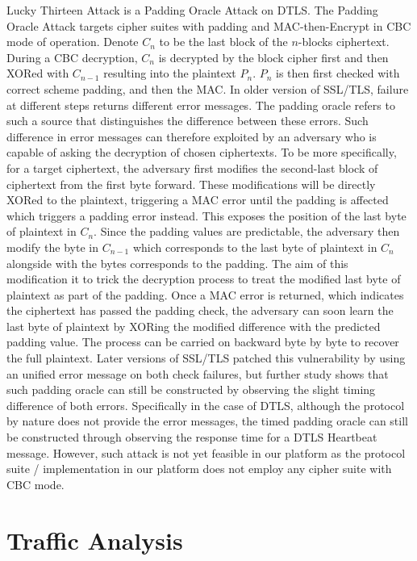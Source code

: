 Lucky Thirteen Attack\cite{Lucky13} is a Padding Oracle Attack\cite{PaddingOracle} on DTLS. The Padding Oracle Attack targets cipher suites with padding and MAC-then-Encrypt in CBC mode of operation. Denote $C_n$ to be the last block of the $n$-blocks ciphertext. During a CBC decryption, $C_n$ is decrypted by the block cipher first and then XORed with $C_{n-1}$ resulting into the plaintext $P_n$. $P_n$ is then first checked with correct scheme padding, and then the MAC. In older version of SSL/TLS, failure at different steps returns different error messages. The padding oracle refers to such a source that distinguishes the difference between these errors. Such difference in error messages can therefore exploited by an adversary who is capable of asking the decryption of chosen ciphertexts. To be more specifically, for a target ciphertext, the adversary first modifies the second-last block of ciphertext from the first byte forward. These modifications will be directly XORed to the plaintext, triggering a MAC error until the padding is affected which triggers a padding error instead. This exposes the position of the last byte of plaintext in $C_n$. Since the padding values are predictable, the adversary then modify the byte in $C_{n-1}$ which corresponds to the last byte of plaintext in $C_n$ alongside with the bytes corresponds to the padding. The aim of this modification it to trick the decryption process to treat the modified last byte of plaintext as part of the padding. Once a MAC error is returned, which indicates the ciphertext has passed the padding check, the adversary can soon learn the last byte of plaintext by XORing the modified difference with the predicted padding value. The process can be carried on backward byte by byte to recover the full plaintext.  Later versions of SSL/TLS patched this vulnerability by using an unified error message on both check failures, but further study\cite{Lucky13} shows that such padding oracle can still be constructed by observing the slight timing difference of both errors. Specifically in the case of DTLS, although the protocol by nature does not provide the error messages, the timed padding oracle can still be constructed through observing the response time for a DTLS Heartbeat message. However, such attack is not yet feasible in our platform as the protocol suite / implementation in our platform does not employ any cipher suite with CBC mode.



\section{Traffic Analysis}

